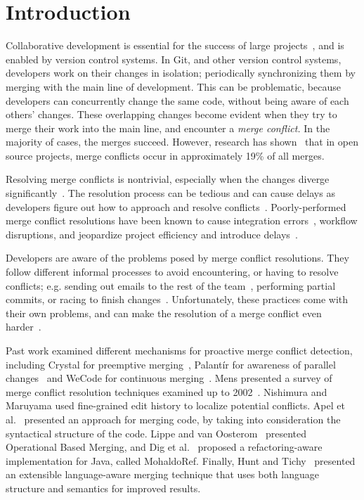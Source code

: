 
\section{Introduction}\label{introduction}

Collaborative development is essential for the success of large projects~\cite{hattori2010syde}, and is enabled by version control systems. 
In Git, and other version control systems, developers work on their changes in isolation; periodically synchronizing them by merging with the main line of development. 
This can be problematic, because developers can concurrently change the same code, without being aware of each others' changes.
These overlapping changes become evident when they try to merge their work into the main line, and encounter a \emph{merge conflict.}
In the majority of cases, the merges succeed.
However, research has shown~\cite{cassandra,Brun2011} that in open source projects, merge conflicts occur in approximately 19\% of all merges.

Resolving merge conflicts is nontrivial, especially when the changes diverge significantly~\cite{Brun2011}.
The resolution process can be tedious and can cause delays as developers figure out how to approach and resolve conflicts~\cite{cassandra}. 
Poorly-performed merge conflict resolutions have been known to cause integration errors~\cite{bird-branches-conflict}, workflow disruptions, and jeopardize project efficiency and introduce delays~\cite{estler2014awareness}. 

Developers are aware of the problems posed by merge conflict resolutions.
They follow different informal processes to avoid encountering, or having to resolve conflicts; e.g. sending out emails to the rest of the team~\cite{deSouza2003breaking}, performing partial commits, or racing to finish changes~\cite{cataldo2008distributed_dev}.
Unfortunately, these practices come with their own problems, and can make the resolution of a merge conflict even harder~\cite{Brun2011}. 

Past work examined different mechanisms for proactive merge conflict detection, including Crystal for preemptive merging~\cite{Brun2011}, Palant\'{i}r for awareness of parallel changes~\cite{palantir} and WeCode for continuous merging~\cite{Guimaraes}.
Mens presented a survey of merge conflict resolution techniques examined up to 2002~\cite{mens2002state}.
Nishimura and Maruyama \cite{nishimura} used fine-grained edit history to localize potential conflicts.
Apel et al.~\cite{apel_semistructured_2011,apel_structured_2012-1} presented an approach for merging code, by taking into consideration the syntactical structure of the code.
Lippe and van Oosterom~\cite{lippe_operation-based_1992} presented Operational Based Merging, and Dig et al.~\cite{danny2008tse} proposed a refactoring-aware implementation for Java, called MohaldoRef.
Finally, Hunt and Tichy~\cite{hunt2002extensible} presented an extensible language-aware merging technique that uses both language structure and semantics for improved results.

